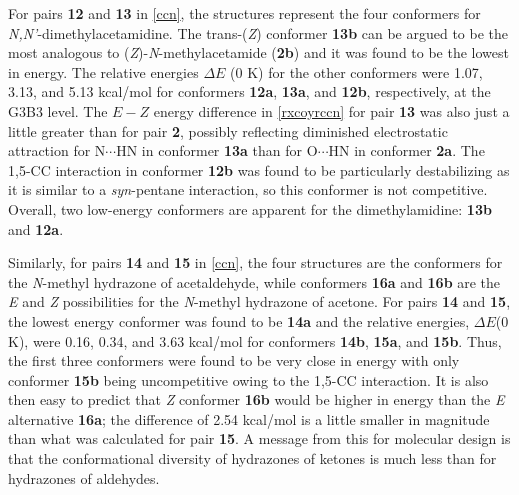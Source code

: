 \documentclass[12pt]{report}
\begin{document}
For pairs \textbf{12} and \textbf{13} in \cref{ccn}, the structures represent the four conformers for \textit{N,N'}-dimethylacetamidine. The trans-(\textit{Z}) conformer \textbf{13b} can be argued to be the most analogous to (\textit{Z})-\textit{N}-methylacetamide (\textbf{2b}) and it was found to be the lowest in energy. The relative energies $\Delta E$ (0 K) for the other conformers were 1.07, 3.13, and 5.13 kcal/mol for conformers \textbf{12a}, \textbf{13a}, and \textbf{12b}, respectively, at the G3B3 level. The $E-Z$ energy difference in \cref{rxcoyrccn} for pair \textbf{13} was also just a little greater than for pair \textbf{2}, possibly reflecting diminished electrostatic attraction for N$\cdots$HN in conformer \textbf{13a} than for O$\cdots$HN in conformer \textbf{2a}. The 1,5-CC interaction in conformer \textbf{12b} was found to be particularly destabilizing as it is similar to a \textit{syn}-pentane interaction, so this conformer is not competitive. Overall, two low-energy conformers are apparent for the dimethylamidine: \textbf{13b} and \textbf{12a}.

Similarly, for pairs \textbf{14} and \textbf{15} in \cref{ccn}, the four structures are the conformers for the \textit{N}-methyl hydrazone of acetaldehyde, while conformers \textbf{16a} and \textbf{16b} are the \textit{E} and \textit{Z} possibilities for the \textit{N}-methyl hydrazone of acetone. For pairs \textbf{14} and \textbf{15}, the lowest energy conformer was found to be \textbf{14a} and the relative energies, $\Delta E$(0 K), were 0.16, 0.34, and 3.63 kcal/mol for conformers \textbf{14b}, \textbf{15a}, and \textbf{15b}. Thus, the first three conformers were found to be very close in energy with only conformer \textbf{15b} being uncompetitive owing to the 1,5-CC interaction. It is also then easy to predict that \textit{Z} conformer \textbf{16b} would be higher in energy than the \textit{E} alternative \textbf{16a}; the difference of 2.54 kcal/mol is a little smaller in magnitude than what was calculated for pair \textbf{15}. A message from this for molecular design is that the conformational diversity of hydrazones of ketones is much less than for hydrazones of aldehydes.
\end{document}
